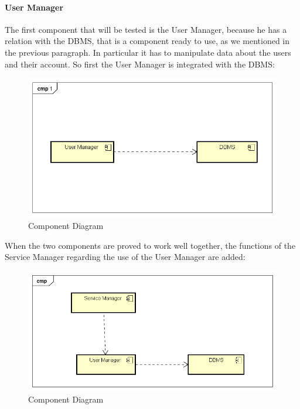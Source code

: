 \paragraph{User Manager}
The first component that will be tested is the User Manager, because he has a relation with the DBMS, that is a component ready to use, as we mentioned in the previous paragraph. In particular it has to manipulate data about the users and their account.
So first the User Manager is integrated with the DBMS:

\begin{figure}[H]	
	\centering
	\includegraphics[width=\textwidth]{img/UserMan_DBMS_int}
	\caption{Component Diagram}
\end{figure}
\noindent
When the two components are proved to work well together, the functions of the Service Manager regarding the use of the User Manager are added: 

\begin{figure}[H]	
	\centering
	\includegraphics[width=\textwidth]{img/UserMan_SrvMan_int}
	\caption{Component Diagram}
\end{figure}
